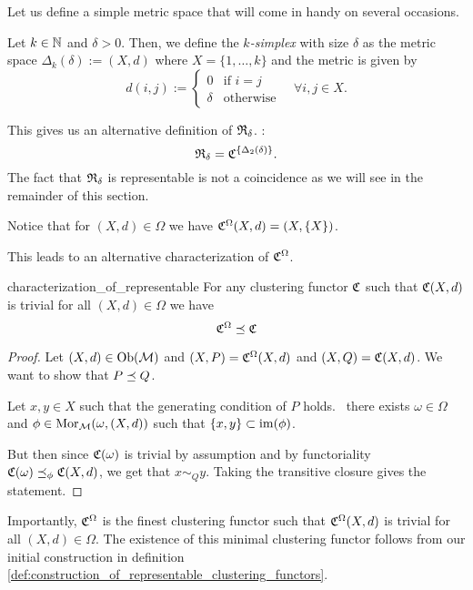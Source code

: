 Let us define a simple metric space that will come in handy on several occasions.
\begin{definition}{}{}
    Let $k \in \mathbb N$ and $\delta > 0$. Then, we define the \emph{$k$-simplex} with size $\delta$ as the metric space $\Delta_k(\delta) := (X,d)$ where $X = \{1, \dots, k\}$ and the metric is given by
    $$
    d(i,j) := \begin{cases}
        0 & \text{if } i = j\\
        \delta & \text{otherwise}
    \end{cases} \quad \forall i,j \in X.
    $$
\end{definition}

This gives us an alternative definition of $\mathfrak{R}_\delta$. \Ie:
$$
\mathfrak{R}_\delta = \mathfrak{C}^{\{\Delta_2(\delta)\}}.
$$
The fact that $\mathfrak{R}_\delta$ is representable is not a coincidence as we will see in the remainder of this section.
\begin{myremark}{\cite[Rem.~6.3]{Carlsson2010}}{}
Notice that for $(X,d) \in \Omega$ we have $\mathfrak{C}^\Omega(X,d) = (X, \{X\})$.
\end{myremark}

This leads to an alternative characterization of $\mathfrak{C}^\Omega$.

\begin{proposition}{}{characterization_of_representable}
For any clustering functor $\mathfrak{C}$ such that $\mathfrak{C}(X,d)$ is trivial for all $(X,d) \in \Omega$ we have
$$
\mathfrak{C}^\Omega \preceq \mathfrak{C}
$$
\end{proposition}

\begin{proof}
Let $(X,d) \in \mathrm {Ob}(\mathcal{M})$ and $(X,P) = \mathfrak{C}^\Omega(X,d)$ and $(X,Q) = \mathfrak{C}(X,d)$. We want to show that $P \preceq Q$.

Let $x,y \in X$ such that the generating condition of $P$ holds. \Ie\ there exists $\omega \in \Omega$ and $\phi \in \mathrm {Mor}_{\mathcal{M}}(\omega, (X,d))$ such that $\{x,y\} \subset \operatorname*{im}(\phi)$.

But then since $\mathfrak{C}(\omega)$ is trivial by assumption and by functoriality $\mathfrak{C}(\omega) \preceq_\phi \mathfrak{C}(X,d)$, we get that $x \sim_Q y$. Taking the transitive closure gives the statement.


\end{proof}

Importantly, $\mathfrak{C}^\Omega$ is the finest clustering functor such that $\mathfrak{C}^\Omega(X,d)$ is trivial for all $(X,d) \in \Omega$. The existence of this minimal clustering functor follows from our initial construction in definition \ref{def:construction_of_representable_clustering_functors}.


